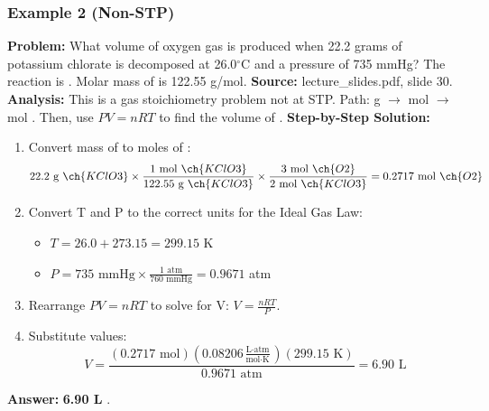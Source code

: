 \documentclass{article}
\begin{document}
\subsubsection{Example 2 (Non-STP)}
\textbf{Problem:} What volume of oxygen gas is produced when 22.2 grams of potassium chlorate is decomposed at 26.0$^\circ$C and a pressure of 735 mmHg? The reaction is . Molar mass of  is 122.55 g/mol.
\textbf{Source:} lecture\_slides.pdf, slide 30.
\textbf{Analysis:} This is a gas stoichiometry problem not at STP. Path: g  $\rightarrow$ mol  $\rightarrow$ mol . Then, use $PV=nRT$ to find the volume of .
\textbf{Step-by-Step Solution:}
\begin{enumerate}
    \item Convert mass of  to moles of :
    \[ 22.2 \text{ g } \ch{KClO3} \times \frac{1 \text{ mol } \ch{KClO3}}{122.55 \text{ g } \ch{KClO3}} \times \frac{3 \text{ mol } \ch{O2}}{2 \text{ mol } \ch{KClO3}} = 0.2717 \text{ mol } \ch{O2} \]
    \item Convert T and P to the correct units for the Ideal Gas Law:
    \begin{itemize}
        \item $T = 26.0 + 273.15 = 299.15$ K
        \item $P = 735 \text{ mmHg} \times \frac{1 \text{ atm}}{760 \text{ mmHg}} = 0.9671$ atm
    \end{itemize}
    \item Rearrange $PV=nRT$ to solve for V: $V = \frac{nRT}{P}$.
    \item Substitute values:
    \[ V = \frac{(0.2717 \text{ mol})(0.08206 \frac{\text{L}\cdot\text{atm}}{\text{mol}\cdot\text{K}})(299.15 \text{ K})}{0.9671 \text{ atm}} = 6.90 \text{ L} \]
\end{enumerate}
\textbf{Answer:} \textbf{6.90 L }.
\end{document}
